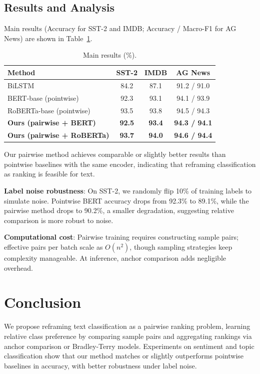 \documentclass[11pt, a4paper]{article}
\begin{document}
\subsection{Results and Analysis}

Main results (Accuracy for SST-2 and IMDB; Accuracy / Macro-F1 for AG News) are shown in Table~\ref{tab:results}.

\begin{table}[htbp]
\centering
\caption{Main results (\%).}
\label{tab:results}
\begin{tabular}{lccc}
\toprule
Method & SST-2 & IMDB & AG News \\
\midrule
BiLSTM & 84.2 & 87.1 & 91.2 / 91.0 \\
BERT-base (pointwise) & 92.3 & 93.1 & 94.1 / 93.9 \\
RoBERTa-base (pointwise) & 93.5 & 93.8 & 94.5 / 94.3 \\
\textbf{Ours (pairwise + BERT)} & \textbf{92.5} & \textbf{93.4} & \textbf{94.3 / 94.1} \\
\textbf{Ours (pairwise + RoBERTa)} & \textbf{93.7} & \textbf{94.0} & \textbf{94.6 / 94.4} \\
\bottomrule
\end{tabular}
\end{table}

Our pairwise method achieves comparable or slightly better results than pointwise baselines with the same encoder, indicating that reframing classification as ranking is feasible for text.

\textbf{Label noise robustness}: On SST-2, we randomly flip 10\% of training labels to simulate noise. Pointwise BERT accuracy drops from 92.3\% to 89.1\%, while the pairwise method drops to 90.2\%, a smaller degradation, suggesting relative comparison is more robust to noise.

\textbf{Computational cost}: Pairwise training requires constructing sample pairs; effective pairs per batch scale as $O(n^2)$, though sampling strategies keep complexity manageable. At inference, anchor comparison adds negligible overhead.

\section{Conclusion}

We propose reframing text classification as a pairwise ranking problem, learning relative class preference by comparing sample pairs and aggregating rankings via anchor comparison or Bradley-Terry models. Experiments on sentiment and topic classification show that our method matches or slightly outperforms pointwise baselines in accuracy, with better robustness under label noise.
\end{document}
